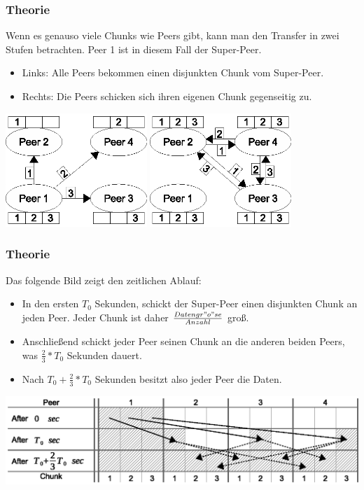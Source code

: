 \begin{frame}
  \frametitle{Theorie}
  Wenn es genauso viele Chunks wie Peers gibt, kann man den Transfer in zwei Stufen betrachten. Peer 1 ist in diesem Fall der Super-Peer.
  \begin{itemize}
    \item Links: Alle Peers bekommen einen disjunkten Chunk vom Super-Peer. 
    \item Rechts: Die Peers schicken sich ihren eigenen Chunk gegenseitig zu. 
  \end{itemize}

  \begin{center}
    \includegraphics[width=0.4\textwidth]{fig/chunkedswarmmodel1.eps}
    \hspace{0.15\textwidth}
    \includegraphics[width=0.4\textwidth]{fig/chunkedswarmmodel2.eps}
  \end{center}
\end{frame}


\begin{frame}
  \frametitle{Theorie}
  Das folgende Bild zeigt den zeitlichen Ablauf:
  \begin{itemize}
    \item In den ersten $T_0$ Sekunden, schickt der Super-Peer einen disjunkten Chunk an jeden Peer. Jeder Chunk ist daher $\frac{Datengr"o"se}{Anzahl}$ groß.
    \item Anschließend schickt jeder Peer seinen Chunk an die anderen beiden Peers, was $\frac{2}{3} * T_0$ Sekunden dauert.
    \item Nach $T_0 + \frac{2}{3} * T_0$ Sekunden besitzt also jeder Peer die Daten.
  \end{itemize}

  \begin{center}
    \includegraphics[width=1\textwidth]{fig/chunkedswarmformula1.eps}
  \end{center}
\end{frame}



